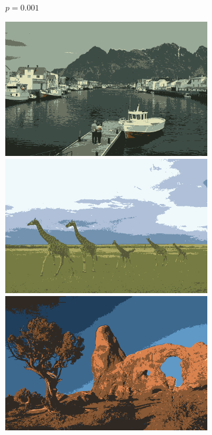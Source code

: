 \documentclass[11pt,a4paper]{article}
\begin{document}
\begin{figure}
\begin{subfigure}[b]{0.24\textwidth}
        \caption{$p=0.001$}
    \end{subfigure}
    \hfill
    \begin{subfigure}[b]{0.24\textwidth}
        \centering
        \includegraphics[width=\textwidth]{figures/sampling_rate/0.0025/219090_avg.png}
        \includegraphics[width=\textwidth]{figures/sampling_rate/0.0025/253055_avg.png}
        \includegraphics[width=\textwidth]{figures/sampling_rate/0.0025/295087_avg.png}

\end{subfigure}
\end{figure}
\end{document}
